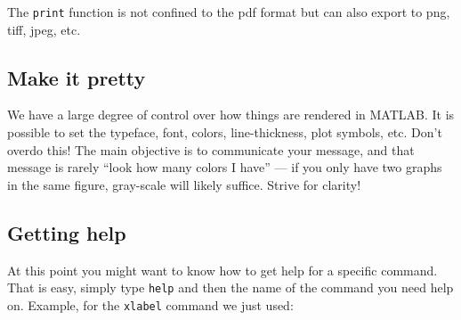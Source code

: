 The \lstinline{print} function is not confined to the pdf format but can also export to png, tiff, jpeg, etc.

\subsection{Make it pretty}
We have a large degree of control over how things are rendered in MATLAB\@. 
It is possible to set the typeface, font, colors, line-thickness, plot symbols, etc.
Don't overdo this! The main objective is to communicate your message, and that message is rarely ``look how many colors I have'' --- if you only have two graphs in the same figure, gray-scale will likely suffice. Strive for clarity!

\subsection{Getting help}
At this point you might want to know how to get help for a specific command.
That is easy, simply type \lstinline{help} and then the name of the command you need help on.
Example, for the \lstinline{xlabel} command we just used: